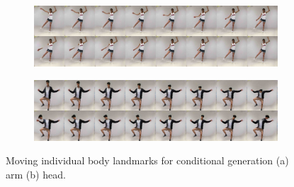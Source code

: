 
	\begin{figure}[htp]
		\centering
		\begin{subfigure}{1.\linewidth}
		\includegraphics[trim={0cm 0cm 0cm 0cm},clip, width=1.0\linewidth]{fig/factor/8arm}\caption{}
		\end{subfigure}

		\begin{subfigure}{1.\linewidth}
			\includegraphics[trim={0cm 0cm 0cm 0cm},clip, width=1.0\linewidth]{fig/factor/8head}\caption{}
		\end{subfigure}
		\caption{Moving individual body landmarks for conditional generation (a) arm (b) head.}
		\label{fig:movekp}
	\end{figure}


